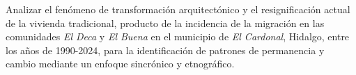 
Analizar el fenómeno de transformación arquitectónico y el resignificación actual de la vivienda tradicional, producto de la incidencia de la migración en las comunidades \emph{El Deca} y \emph{El Buena} en el municipio de \emph{El Cardonal}, Hidalgo, entre los años de 1990-2024, para la identificación de patrones de permanencia y cambio mediante un enfoque sincrónico y etnográfico.
